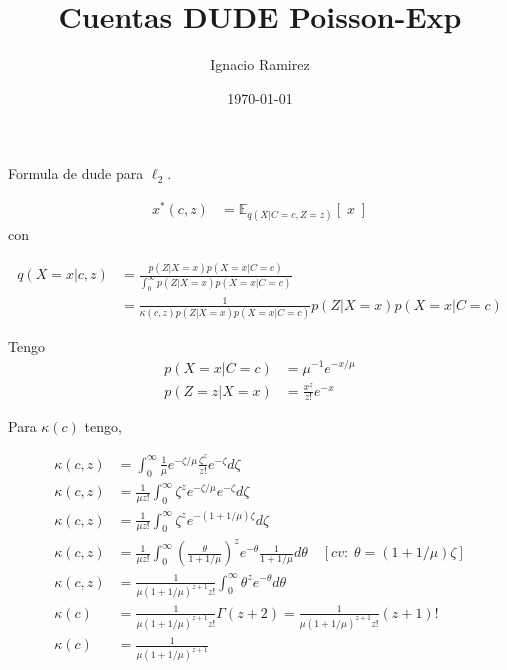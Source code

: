 \documentclass{report}
\title{Cuentas DUDE Poisson-Exp}
\author{Ignacio Ramirez}
\date{\today}
\def\opt{\ensuremath{^{*}}}
\def\loss{\ell}
\def\expect{\ensuremath{\mathbb{E}}}
\begin{document}
\maketitle

Formula de dude para $\ell_2$. 

\begin{align}
x\opt(c,z) &= \expect_{q(X|C=c,Z=z)}\left[\;x\;\right]
\end{align}
con

\begin{align}
q(X=x|c,z) &=
\frac{p(Z|X=x)p(X=x|C=c)}{\int_0^{\infty}{p(Z|X=x)p(X=x|C=c)}} \\
 &= \frac{1}{\kappa(c,z)p(Z|X=x)p(X=x|C=c)} p(Z|X=x)p(X=x|C=c) 
\end{align}


Tengo
\begin{align}
p(X=x|C=c) &= \mu^{-1} e^{-x/\mu}\\
p(Z=z|X=x) &= \frac{x^z}{z!}e^{-x}
\end{align}

Para $\kappa(c)$ tengo,

\begin{align}
\kappa(c,z) &= 
  \int_{0}^{\infty}
  {
    \frac{1}{\mu}
    e^{-\zeta/\mu}
    \frac{\zeta^z}{z!}
    e^{-\zeta} 
    d\zeta
  } \\
\kappa(c,z) &= 
  \frac{1}{\mu{z!}}
  \int_{0}^{\infty}
  {
    \zeta^{z}
    e^{-\zeta/\mu}
    e^{-\zeta} 
    d\zeta
  } \\
\kappa(c,z) &=
  \frac{1}{\mu{z!}}
  \int_{0}^{\infty}
  {
    \zeta^{z}
    e^{-(1+1/\mu)\zeta}
    d\zeta
  } \\
\kappa(c,z) &=
\frac{1}{\mu{z!}}\int_{0}^{\infty}
{
  \left(
    \frac{\theta}{1+1/\mu}
  \right)^{z}
  e^{-\theta}
  \frac{1}{1+1/\mu}
  d\theta
}
\quad [cv:\;\theta=(1+1/\mu)\zeta] \\
\kappa(c,z) &=
\frac{1}{\mu(1+1/\mu)^{z+1}z!}
\int_{0}^{\infty}
{
  \theta^{z}
  e^{-\theta}
  d\theta
} \\
\kappa(c) &=
\frac{1}{\mu(1+1/\mu)^{z+1}z!}
\Gamma(z+2) = 
\frac{1}{\mu(1+1/\mu)^{z+1}z!} (z+1)!
\\
\kappa(c) &= \frac{1}{\mu(1+1/\mu)^{z+1}}
\end{align}
\end{document}
